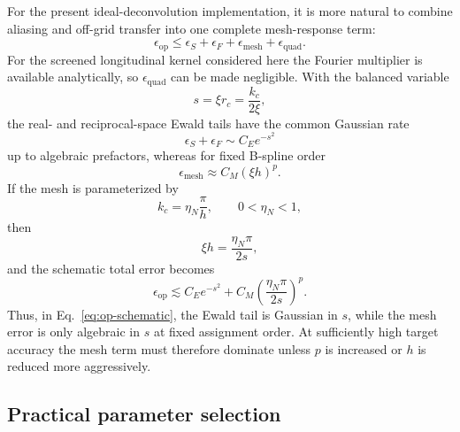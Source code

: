 \documentclass[11pt]{article}
\theoremstyle{plain}
\DeclareRobustCommand{\_}{\textunderscore\allowbreak}
\begin{document}
For the present ideal-deconvolution implementation, it is more natural to
combine aliasing and off-grid transfer into one complete mesh-response term:
\begin{equation}
\label{eq:op-budget}
\epsilon_{\mathrm{op}}
\le
\epsilon_S
+
\epsilon_F
+
\epsilon_{\mathrm{mesh}}
+
\epsilon_{\mathrm{quad}}.
\end{equation}
For the screened longitudinal kernel considered here the Fourier multiplier
is available analytically, so $\epsilon_{\mathrm{quad}}$ can be made
negligible. With the balanced variable
\begin{equation}
s
=
\xi r_c
=
\frac{k_c}{2\xi},
\end{equation}
the real- and reciprocal-space Ewald tails have the common Gaussian rate
\begin{equation}
\epsilon_S+\epsilon_F
\sim
C_E e^{-s^2}
\end{equation}
up to algebraic prefactors, whereas for fixed B-spline order
\begin{equation}
\epsilon_{\mathrm{mesh}}
\approx
C_M(\xi h)^p.
\end{equation}
If the mesh is parameterized by
\begin{equation}
k_c
=
\eta_N\frac{\pi}{h},
\qquad 0<\eta_N<1,
\end{equation}
then
\begin{equation}
\xi h
=
\frac{\eta_N\pi}{2s},
\end{equation}
and the schematic total error becomes
\begin{equation}
\label{eq:op-schematic}
\epsilon_{\mathrm{op}}
\lesssim
C_Ee^{-s^2}
+
C_M
\left(
\frac{\eta_N\pi}{2s}
\right)^p.
\end{equation}
Thus, in Eq.~\eqref{eq:op-schematic}, the Ewald tail is Gaussian in $s$,
while the mesh error is only
algebraic in $s$ at fixed assignment order. At sufficiently high target
accuracy the mesh term must therefore dominate unless $p$ is increased or
$h$ is reduced more aggressively.

\subsection{Practical parameter selection}
\end{document}
